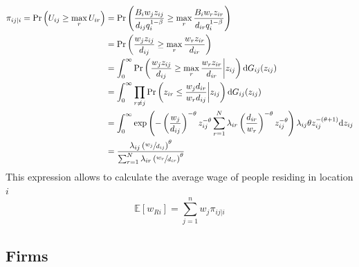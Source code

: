 \documentclass[12pt]{article}
\newcommand{\E}{\mathbb{E}}
\begin{document}
\begin{align*}
    \pi_{ij\vert i} = \Pr\left(U_{ij}\geq \max_{r}U_{ir}\right) &= \Pr\left(\frac{B_iw_jz_{ij}}{d_{ij}q_i^{1-\beta}} \geq \max_{r} \frac{B_iw_rz_{ir}}{d_{ir}q_i^{1-\beta}} \right) \\ 
    &= \Pr\left(\frac{w_jz_{ij}}{d_{ij}} \geq \max_{r} \frac{w_rz_{ir}}{d_{ir}} \right) \\ 
    &= \int_0^\infty\Pr\left(\frac{w_jz_{ij}}{d_{ij}} \geq \max_{r} \frac{w_rz_{ir}}{d_{ir}}\bigg\vert z_{ij} \right) \mathrm{d}G_{ij}(z_{ij}) \\ 
    &= \int_0^\infty\prod_{r\neq j}\Pr\left(z_{ir}\leq \frac{w_jd_{ir}}{w_rd_{ij}}\bigg\vert z_{ij} \right) \mathrm{d}G_{ij}(z_{ij}) \\ 
    &= \int_0^\infty \exp\left(-\left(\frac{w_j}{d_{ij}}\right)^{-\theta}z_{ij}^{-\theta}\sum_{r=1}^N\lambda_{ir}\left(\frac{d_{ir}}{w_r}\right)^{-\theta}z_{ij}^{-\theta}\right)\lambda_{ij}\theta z_{ij}^{-(\theta+1)}\mathrm{d}z_{ij} \\ 
    &= \frac{\lambda_{ij}\left(\sfrac{w_j}{d_{ij}}\right)^\theta}{\sum_{r=1}^N \lambda_{ir}\left(\sfrac{w_r}{d_{ir}}\right)^{\theta}}
\end{align*}
This expression allows to calculate the average wage of people residing in location $i$
\begin{equation*}
    \E\left[w_{Ri} \right] = \boxed{\sum_{j=1}^n w_j \pi_{ij\vert i}}
\end{equation*}

\subsection{Firms}
\end{document}

